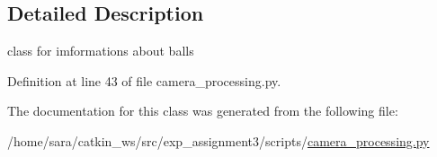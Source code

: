 \subsection{Detailed Description}
class for imformations about balls 

Definition at line 43 of file camera\+\_\+processing.\+py.



The documentation for this class was generated from the following file\+:\begin{DoxyCompactItemize}
\item 
/home/sara/catkin\+\_\+ws/src/exp\+\_\+assignment3/scripts/\hyperlink{camera__processing_8py}{camera\+\_\+processing.\+py}\end{DoxyCompactItemize}
